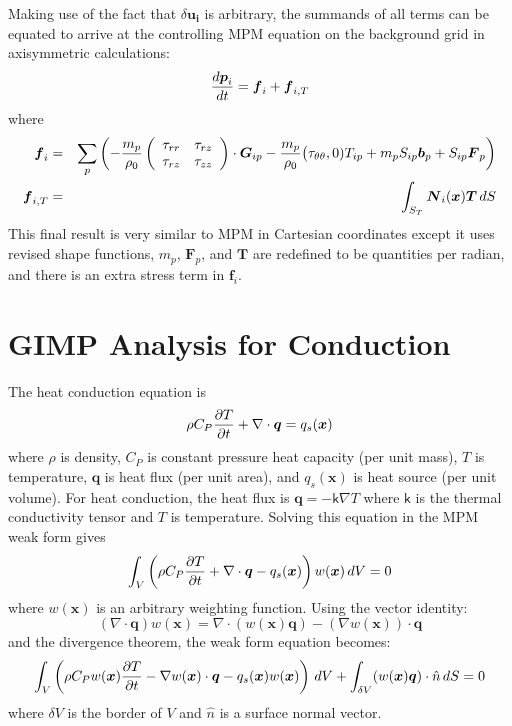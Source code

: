 \documentclass[11pt]{article}
\renewcommand{\vec}[1]{\boldsymbol{#1}}
\newcommand{\tens}[1]{\boldsymbol{\mathsf{#1}}}
\begin{document}
Making use of the fact that $\delta\vec{u_i}$ is arbitrary, the summands of all terms can be equated to arrive at the controlling MPM equation on the background grid in axisymmetric calculations:
\begin{equation}
    {d\vec p_i\over dt}= \vec f_i + \vec f_{i,T}
\end{equation}
where
\begin{eqnarray}
	 \vec f_i & = & \sum_p \left(-{m_p\over \rho_0}\left(\begin{array}{cc} \tau_{rr} & \tau_{rz} \\ \tau_{rz} & \tau_{zz} \end{array}\right)\cdot \vec G_{ip} 
	       - {m_p\over \rho_0} \bigl( \tau_{\theta\theta},0) T_{ip} + m_p S_{ip}  \vec b_p + S_{ip} \vec F_p\right) \\
	 \vec f_{i,T} & = & \int_{S_T}\vec N_i(\vec x) \vec T \thinspace dS
\end{eqnarray}
This final result is very similar to MPM in Cartesian coordinates except it uses revised shape functions, $m_p$, $\vec F_p$, and $\vec T$ are redefined to be quantities per radian, and there is an extra stress term in $\vec f_i$.


\section{GIMP Analysis for Conduction}

The heat conduction equation is
\begin{equation}
   \rho C_P {\partial T\over \partial t} + \nabla \cdot \vec q = q_s(\vec x)
\end{equation}
where $\rho$ is density, $C_P$ is constant pressure heat capacity (per unit mass), $T$ is temperature, $\vec q$ is heat flux (per unit area), and $q_s(\vec x)$ is heat source (per unit volume). For heat conduction, the heat flux is $\vec q = -\tens k\nabla T$ where $\tens k$ is the thermal conductivity tensor and $T$ is temperature. Solving this equation in the MPM weak form gives
\begin{equation}
   \int_V \left(\rho C_P {\partial T\over \partial t} + \nabla \cdot \vec q - q_s(\vec x)\right)w(\vec x)\thinspace dV = 0
\end{equation}
where $w(\vec x)$ is an arbitrary weighting function. Using the vector identity:
\begin{equation}
     \left(\nabla\cdot\vec q\right)w(\vec x) = \nabla \cdot \left(w(\vec x)\vec q\right) - \left(\nabla w(\vec x)\right)\cdot \vec q 
\end{equation}
and the divergence theorem, the weak form equation becomes:
\begin{equation}
    \int_V \left(\rho C_Pw(\vec x) {\partial T\over \partial t} -\nabla w(\vec x) \cdot \vec q - q_s(\vec x)w(\vec x)\right)\thinspace dV  + \int_{\delta V} (w(\vec x)\vec q) \cdot \hat n \thinspace dS = 0
\end{equation}
where $\delta V$ is the border of $V$ and $\hat n$ is a surface normal vector.
\end{document}
